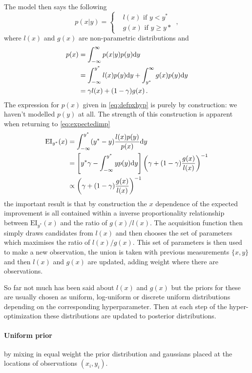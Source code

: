 The model then says the following
\begin{equation}
    p(x|y) =
    \begin{cases}
        &l(x) \text{ if } y<y^* \\
        &g(x) \text{ if } y\geq y*
    \end{cases} \, ,
\end{equation}
where $l(x)$ and $g(x)$ are non-parametric distributions and
\begin{align}
    p(x) &= \int_{- \infty}^{\infty} p(x|y)p(y){\rm d} y \\
    &= \int_{- \infty}^{y^*} l(x)p(y){\rm d} y + \int_{y^*}^{\infty} g(x)p(y){\rm d} y \nonumber\\
    &= \gamma l(x) + (1-\gamma)g(x) \label{eq:defpxhyp} \, .
\end{align}
The expression for $p(x)$ given in \eqref{eq:defpxhyp} is purely by construction:
we haven't modelled $p(y)$ at all. The strength of this construction is apparent
when returning to \eqref{eq:expectedimp}
\begin{align}
    \mathrm{EI}_{y^{*}}(x) &= \int_{- \infty}^{y^*} (y^{*} - y)\frac{l(x)p(y)}{p(x)} {\rm d} y\\
    &= \left[y^* \gamma - \int_{- \infty}^{y^*} yp(y) {\rm d} y \right]\left( \gamma + (1-\gamma)\frac{g(x)}{l(x)}\right)^{-1} \\
    & \propto \left( \gamma + (1-\gamma)\frac{g(x)}{l(x)}\right)^{-1}
\end{align}
the important result is that by construction the $x$ dependence of the expected
improvement is all contained within a inverse proportionality relationship
between $\mathrm{EI}_{y^{*}}(x)$ and the ratio of $g(x)/l(x)$. The acquisition
function then simply draws candidates from $l(x)$ and then chooses the set of parameters
which maximises the ratio of $l(x)/g(x)$. This set of parameters is then used
to make a new observation, the union is taken with previous measurements $\{x, y\}$
and then $l(x)$ and $g(x)$ are updated, adding weight where there are observations.

So far not much has been said about $l(x)$ and $g(x)$ but the priors for these
are usually chosen as uniform, log-uniform or discrete uniform distributions
depending on the corresponding hyperparameter. Then at each step of the
hyper-optimization these distributions are updated to posterior distributions.
\paragraph[]{Uniform prior} by
mixing in equal weight the prior distribution and gaussians placed at the locations of observations
$(x_i, y_i)$.
